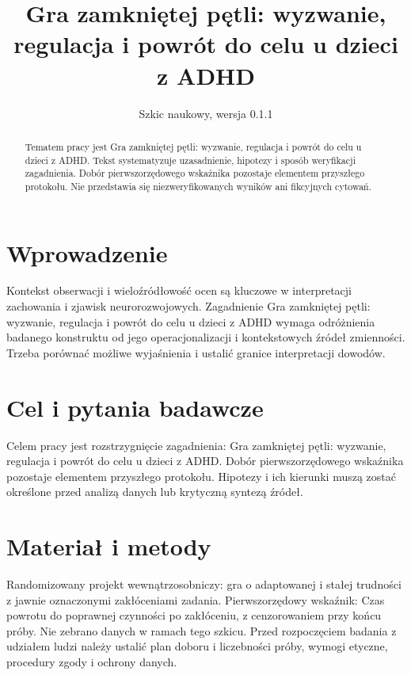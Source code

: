 \documentclass[11pt,a4paper]{article}
\title{Gra zamkniętej pętli: wyzwanie, regulacja i powrót do celu u dzieci z ADHD}
\author{}
\date{Szkic naukowy, wersja 0.1.1}
\begin{document}
\maketitle

\begin{abstract}

Tematem pracy jest Gra zamkniętej pętli: wyzwanie, regulacja i powrót do celu u dzieci z ADHD. Tekst systematyzuje uzasadnienie, hipotezy i sposób weryfikacji zagadnienia. Dobór pierwszorzędowego wskaźnika pozostaje elementem przyszłego protokołu. Nie przedstawia się niezweryfikowanych wyników ani fikcyjnych cytowań.

\end{abstract}

\section{Wprowadzenie}

Kontekst obserwacji i wieloźródłowość ocen są kluczowe w interpretacji zachowania i zjawisk neurorozwojowych. Zagadnienie Gra zamkniętej pętli: wyzwanie, regulacja i powrót do celu u dzieci z ADHD wymaga odróżnienia badanego konstruktu od jego operacjonalizacji i kontekstowych źródeł zmienności. Trzeba porównać możliwe wyjaśnienia i ustalić granice interpretacji dowodów.

\section{Cel i pytania badawcze}

Celem pracy jest rozstrzygnięcie zagadnienia: Gra zamkniętej pętli: wyzwanie, regulacja i powrót do celu u dzieci z ADHD. Dobór pierwszorzędowego wskaźnika pozostaje elementem przyszłego protokołu. Hipotezy i ich kierunki muszą zostać określone przed analizą danych lub krytyczną syntezą źródeł.

\section{Materiał i metody}

Randomizowany projekt wewnątrzosobniczy: gra o adaptowanej i stałej trudności z jawnie oznaczonymi zakłóceniami zadania. Pierwszorzędowy wskaźnik: Czas powrotu do poprawnej czynności po zakłóceniu, z cenzorowaniem przy końcu próby. Nie zebrano danych w ramach tego szkicu. Przed rozpoczęciem badania z udziałem ludzi należy ustalić plan doboru i liczebności próby, wymogi etyczne, procedury zgody i ochrony danych.
\end{document}
